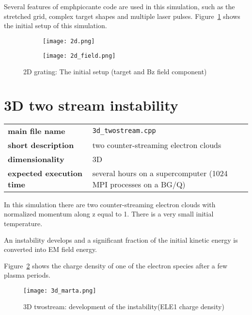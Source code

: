 \documentclass[11pt,a4paper]{report}
\begin{document}
Several features of emph{piccante} code are used in this simulation, such as the stretched grid, complex target shapes and multiple laser pulses. Figure~\ref{pic_2dgrt} shows the initial setup of this simulation.

\begin{figure}[htbp]
        \centering
          \begin{subfigure}[c]{0.3\textwidth}
                \texttt{[image: 2d.png]}

        \end{subfigure}
                  \begin{subfigure}[c]{0.4\textwidth}
                \texttt{[image: 2d\_field.png]}

        \end{subfigure}
        \caption{2D grating: The initial setup (target and Bz field component)}\label{pic_2dgrt}
\end{figure}

\section{3D two stream instability}
\begin{center}
    \begin{tabular}{ l l }
    	\textbf{main file name}          & \verb+3d_twostream.cpp+                                          \\
    	\textbf{short description}       & two counter-streaming electron clouds                            \\
    	\textbf{dimensionality}          & 3D                                                               \\
    	\textbf{expected execution time} & several hours on a supercomputer (1024 MPI processes on a BG/Q)
    \end{tabular}
    \end{center}
In this simulation there are two counter-streaming electron clouds with normalized momentum along z equal to 1. There is a very small initial temperature.

An instability develops and a significant fraction of the initial kinetic energy is converted into EM field energy.

Figure~\ref{pic_3dtwostream} shows the charge density of one of the electron species after a few plasma periods.
 \begin{figure}[htbp!]
    \centering
    \texttt{[image: 3d\_marta.png]}
    \caption{3D twostream: development of the instability(ELE1 charge density)}\label{pic_3dtwostream}
\end{figure}
\end{document}
